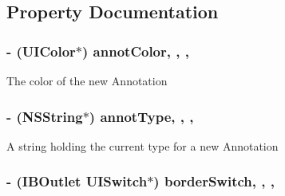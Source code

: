 \subsection{Property Documentation}
\hypertarget{interface_a_p_d_f_new_annotation_v_c_a2ef116193c8d363b5dfa8d8a748e753b}{
\subsubsection[{annot\-Color}]{\setlength{\rightskip}{0pt plus 5cm}-\/ (U\-I\-Color$\ast$) annot\-Color\hspace{0.3cm}{\ttfamily [read]}, {\ttfamily [write]}, {\ttfamily [nonatomic]}, {\ttfamily [retain]}}}\label{interface_a_p_d_f_new_annotation_v_c_a2ef116193c8d363b5dfa8d8a748e753b}
The color of the new Annotation \hypertarget{interface_a_p_d_f_new_annotation_v_c_a8c445f9910a0303436b5792cf3ea28b0}{
\subsubsection[{annot\-Type}]{\setlength{\rightskip}{0pt plus 5cm}-\/ (N\-S\-String$\ast$) annot\-Type\hspace{0.3cm}{\ttfamily [read]}, {\ttfamily [write]}, {\ttfamily [nonatomic]}, {\ttfamily [retain]}}}\label{interface_a_p_d_f_new_annotation_v_c_a8c445f9910a0303436b5792cf3ea28b0}
A string holding the current type for a new Annotation \hypertarget{interface_a_p_d_f_new_annotation_v_c_aa14411e7f7852ef499f4de84bec045e9}{
\subsubsection[{border\-Switch}]{\setlength{\rightskip}{0pt plus 5cm}-\/ (I\-B\-Outlet U\-I\-Switch$\ast$) border\-Switch\hspace{0.3cm}{\ttfamily [read]}, {\ttfamily [write]}, {\ttfamily [nonatomic]}, {\ttfamily [retain]}}}\label{interface_a_p_d_f_new_annotation_v_c_aa14411e7f7852ef499f4de84bec045e9}
